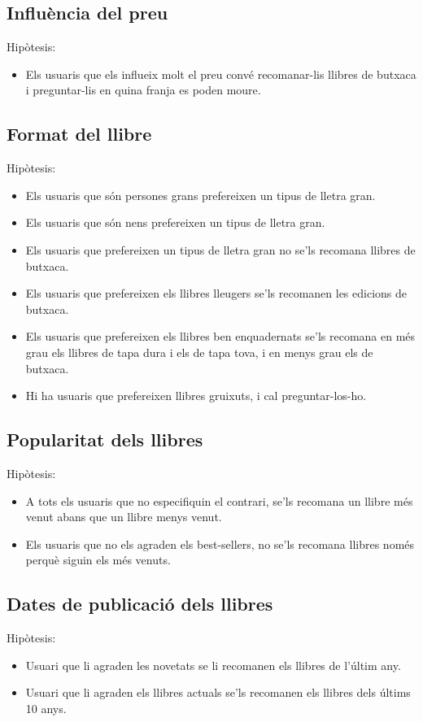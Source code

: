 \subsection{Influència del preu}
Hipòtesis:
\begin{itemize}
  \item Els usuaris que els influeix molt el preu convé recomanar-lis llibres de butxaca i preguntar-lis en quina franja es poden moure.
\end{itemize}

\subsection{Format del llibre}
Hipòtesis:
\begin{itemize}
  \item Els usuaris que són persones grans prefereixen un tipus de lletra gran.
  \item Els usuaris que són nens prefereixen un tipus de lletra gran.
  \item Els usuaris que prefereixen un tipus de lletra gran no se'ls recomana llibres de butxaca.
  \item Els usuaris que prefereixen els llibres lleugers se'ls recomanen les edicions de butxaca.
  \item Els usuaris que prefereixen els llibres ben enquadernats se'ls recomana en més grau els llibres de tapa dura i els de tapa tova, i en menys grau els de butxaca.
  \item Hi ha usuaris que prefereixen llibres gruixuts, i cal preguntar-los-ho.
\end{itemize}

\subsection{Popularitat dels llibres}
Hipòtesis:
\begin{itemize}
  \item A tots els usuaris que no especifiquin el contrari, se'ls recomana un llibre més venut abans que un llibre menys venut.
  \item Els usuaris que no els agraden els best-sellers, no se'ls recomana llibres només perquè siguin els més venuts.
\end{itemize}

\subsection{Dates de publicació dels llibres}
Hipòtesis:
\begin{itemize}
  \item Usuari que li agraden les novetats se li recomanen els llibres de l'últim any.
  \item Usuari que li agraden els llibres actuals se'ls recomanen els llibres dels últims 10 anys.
\end{itemize}

